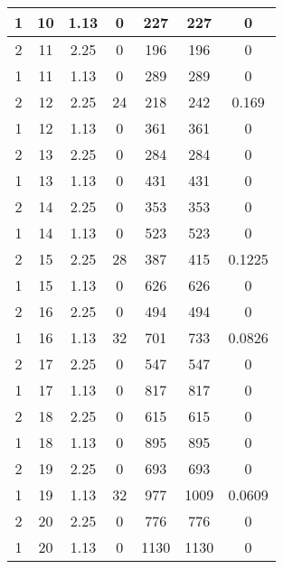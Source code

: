 \documentclass[letterpaper, 12pt]{article}
\begin{document}
\begin{longtable}{|c|c|c|c|c|c|c|}
\hline
1 & 10 & 1.13 & 0 & 227 & 227 & 0 \\
\hline
2 & 11 & 2.25 & 0 & 196 & 196 & 0 \\
\hline
1 & 11 & 1.13 & 0 & 289 & 289 & 0 \\
\hline
2 & 12 & 2.25 & 24 & 218 & 242 & 0.169 \\
\hline
1 & 12 & 1.13 & 0 & 361 & 361 & 0 \\
\hline
2 & 13 & 2.25 & 0 & 284 & 284 & 0 \\
\hline
1 & 13 & 1.13 & 0 & 431 & 431 & 0 \\
\hline
2 & 14 & 2.25 & 0 & 353 & 353 & 0 \\
\hline
1 & 14 & 1.13 & 0 & 523 & 523 & 0 \\
\hline
2 & 15 & 2.25 & 28 & 387 & 415 & 0.1225 \\
\hline
1 & 15 & 1.13 & 0 & 626 & 626 & 0 \\
\hline
2 & 16 & 2.25 & 0 & 494 & 494 & 0 \\
\hline
1 & 16 & 1.13 & 32 & 701 & 733 & 0.0826 \\
\hline
2 & 17 & 2.25 & 0 & 547 & 547 & 0 \\
\hline
1 & 17 & 1.13 & 0 & 817 & 817 & 0 \\
\hline
2 & 18 & 2.25 & 0 & 615 & 615 & 0 \\
\hline
1 & 18 & 1.13 & 0 & 895 & 895 & 0 \\
\hline
2 & 19 & 2.25 & 0 & 693 & 693 & 0 \\
\hline
1 & 19 & 1.13 & 32 & 977 & 1009 & 0.0609 \\
\hline
2 & 20 & 2.25 & 0 & 776 & 776 & 0 \\
\hline
1 & 20 & 1.13 & 0 & 1130 & 1130 & 0 \\
\hline
\end{longtable}
\end{document}
